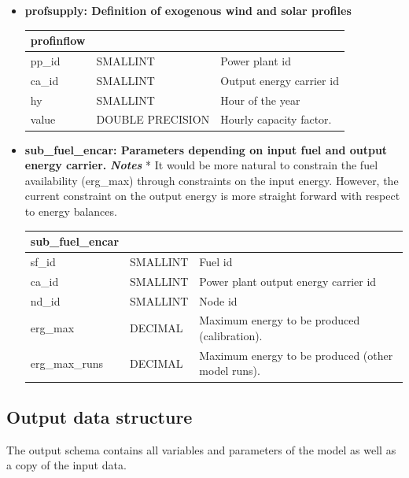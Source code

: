 \documentclass[]{article}
\begin{document}
\begin{itemize}
\item \textbf{profsupply: Definition of exogenous wind and solar profiles}

\begin{tabular}{@{}lll@{}}
\toprule
profinflow & & \\
\midrule
pp\_id & SMALLINT & Power plant id \\
ca\_id & SMALLINT & Output energy carrier id \\
hy & SMALLINT & Hour of the year \\
value & DOUBLE PRECISION & Hourly capacity factor. \\
\bottomrule
\end{tabular}

\item \textbf{sub\_fuel\_encar: Parameters depending on input fuel and output energy carrier.} \textbf{\emph{Notes}} * It would be more natural to constrain the fuel availability (erg\_max) through constraints on the input energy. However, the current constraint on the output energy is more straight forward with respect to energy balances.

\begin{tabular}{@{}lll@{}}
\toprule
sub\_fuel\_encar & & \\
\midrule
sf\_id & SMALLINT & Fuel id\\
ca\_id & SMALLINT & Power plant output energy carrier id \\
nd\_id & SMALLINT & Node id \\
erg\_max & DECIMAL & Maximum energy to be produced (calibration). \\
erg\_max\_runs & DECIMAL & Maximum energy to be produced (other model runs). \\
\bottomrule
\end{tabular}

\end{itemize}

\subsection{Output data structure}\label{output-data-structure}

The output schema contains all variables and parameters of the model as well as a copy of the input data.
\end{document}
